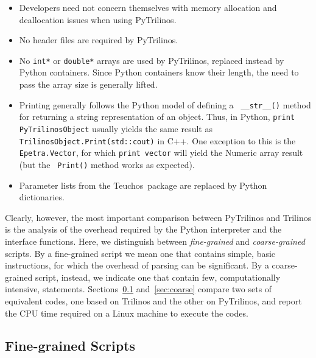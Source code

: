 \documentclass[acmtocl]{acmtrans2m}
\newcommand{\PyTrilinos}{{PyTrilinos}}
\newcommand{\teuchos}{{Teuchos}}
\begin{document}
\begin{itemize}

\item Developers need not concern themselves with memory allocation
  and deallocation issues when using \PyTrilinos.

\item No header files are required by \PyTrilinos.

\item No {\tt int*} or {\tt double*} arrays are used by \PyTrilinos,
  replaced instead by Python containers.  Since Python containers know
  their length, the need to pass the array size is generally lifted.

\item Printing generally follows the Python model of defining a {\tt
  \_\_str\_\_()} method for returning a string representation of an
  object.  Thus, in Python, {\tt print PyTrilinosObject} usually
  yields the same result as {\tt TrilinosObject.Print(std::cout)} in
  C++.  One exception to this is the {\tt Epetra.Vector}, for which
  {\tt print vector} will yield the Numeric array result (but the {\tt
    Print()} method works as expected).

\item Parameter lists from the \teuchos\ package are replaced by
  Python dictionaries.

\end{itemize}

Clearly, however, the most important comparison between PyTrilinos and
Trilinos is the analysis of the overhead required by the Python
interpreter and the interface functions. Here, we distinguish between
{\sl fine-grained} and {\sl coarse-grained} scripts. By a fine-grained
script we mean one that contains simple, basic instructions, for which
the overhead of parsing can be significant. By a coarse-grained
script, instead, we indicate one that contain few, computationally
intensive, statements.  Sections~\ref{sec:fine} and~\ref{sec:coarse}
compare two sets of equivalent codes, one based on Trilinos and the
other on PyTrilinos, and report the CPU time required on a Linux
machine to execute the codes.

\subsection{Fine-grained Scripts}
\label{sec:fine}
\end{document}
